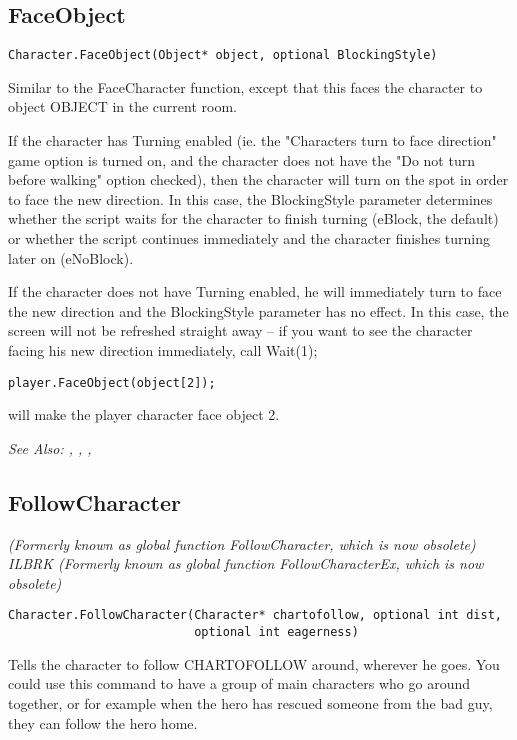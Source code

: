 \subsection{FaceObject}\label{Character.FaceObject}%

\begin{verbatim}
Character.FaceObject(Object* object, optional BlockingStyle)
\end{verbatim}
Similar to the FaceCharacter function, except that this faces the character
to object OBJECT in the current room.

If the character has Turning enabled (ie. the "Characters turn to face direction" game
option is turned on, and the character does not have the "Do not turn before walking"
option checked), then the character will turn on the spot in order to face the new direction.
In this case, the BlockingStyle parameter determines whether the script waits for the
character to finish turning (eBlock, the default) or whether the script continues immediately
and the character finishes turning later on (eNoBlock).

If the character does not have Turning enabled, he will immediately turn to face the
new direction and the BlockingStyle parameter has no effect. In this case, the screen
will not be refreshed straight away -- if you want to see the character facing his new direction
immediately, call  Wait(1);

\begin{verbatim}
player.FaceObject(object[2]);
\end{verbatim}
will make the player character face object 2.

\it{See Also:} ,
,
,


\subsection{FollowCharacter}\label{Character.FollowCharacter}%

\it{(Formerly known as global function FollowCharacter, which is now obsolete)} ILBRK
\it{(Formerly known as global function FollowCharacterEx, which is now obsolete)}

\begin{verbatim}
Character.FollowCharacter(Character* chartofollow, optional int dist,
                          optional int eagerness)
\end{verbatim}
Tells the character to follow CHARTOFOLLOW around, wherever he goes.
You could use this command to have a group of main characters who go around
together, or for example when the hero has rescued someone from the bad
guy, they can follow the hero home.

